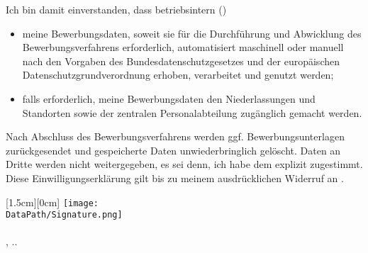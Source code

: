 \documentclass[a4paper,fontsize=12]{scrartcl}
\def\DataPath{data_example}
\newcommand{\PrettyDate}{\number\day{}.\number\month{}.\number\year}
\newcommand{\MySignature}{%
	\parbox{\linewidth}{%
	\bigskip\hspace*{0.6cm}\raisebox{-0.4cm}[1.5cm][0cm]{%
		\texttt{[image: \\DataPath/Signature.png]}\\
	}\\
	\MyCity{}, \PrettyDate \\
	\MyNameFirst{} \MyNameLast
}}
\begin{document}
Ich bin damit einverstanden, dass betriebsintern (\RecpCompany)
\begin{itemize}\itemsep0em
\item meine Bewerbungsdaten, soweit sie für die Durchführung und Abwicklung des Bewerbungsverfahrens erforderlich, automatisiert maschinell oder manuell nach den Vorgaben des Bundesdatenschutzgesetzes und der europäischen Datenschutzgrundverordnung erhoben, verarbeitet und genutzt werden;
\item falls erforderlich, meine Bewerbungsdaten den Niederlassungen und Standorten sowie der zentralen Personalabteilung zugänglich gemacht werden.
\end{itemize}
Nach Abschluss des Bewerbungsverfahrens werden ggf. Bewerbungsunterlagen zurückgesendet und gespeicherte Daten unwiederbringlich gelöscht. Daten an Dritte werden nicht weitergegeben, es sei denn, ich habe dem explizit zugestimmt. Diese Einwilligungserklärung gilt bis zu meinem ausdrücklichen Widerruf an \RecpEmail.

\vfill
\MySignature
\vfill\vfill\vfill
\end{document}
